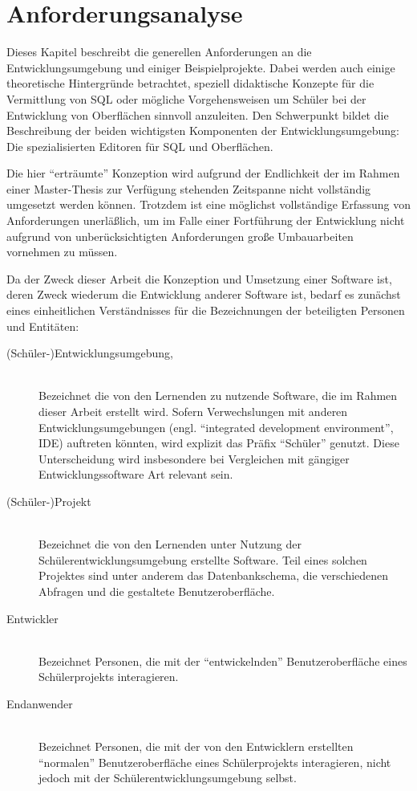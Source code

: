 \section{Anforderungsanalyse}
\label{sec:requirements}

Dieses Kapitel beschreibt die generellen Anforderungen an die Entwicklungsumgebung und einiger Beispielprojekte. Dabei werden auch einige theoretische Hintergründe betrachtet, speziell didaktische Konzepte für die Vermittlung von SQL oder mögliche Vorgehensweisen um Schüler bei der Entwicklung von Oberflächen sinnvoll anzuleiten. Den Schwerpunkt bildet die Beschreibung der beiden wichtigsten Komponenten der Entwicklungsumgebung: Die spezialisierten Editoren für SQL und Oberflächen.

Die hier "`erträumte"' Konzeption wird aufgrund der Endlichkeit der im Rahmen einer Master-Thesis zur Verfügung stehenden Zeitspanne nicht vollständig umgesetzt werden können. Trotzdem ist eine möglichst vollständige Erfassung von Anforderungen unerläßlich, um im Falle einer Fortführung der Entwicklung nicht aufgrund von unberücksichtigten Anforderungen große Umbauarbeiten vornehmen zu müssen.

Da der Zweck dieser Arbeit die Konzeption und Umsetzung einer Software ist, deren Zweck wiederum die Entwicklung anderer Software ist, bedarf es zunächst eines einheitlichen Verständnisses für die Bezeichnungen der beteiligten Personen und Entitäten:

\begin{description}
\item[(Schüler-)Entwicklungsumgebung, \idename] \hfill\\ 
  Bezeichnet die von den Lernenden zu nutzende Software, die im Rahmen dieser Arbeit erstellt wird. Sofern Verwechslungen mit anderen Entwicklungsumgebungen (engl. ``integrated development environment'', IDE) auftreten könnten, wird explizit das Präfix ``Schüler'' genutzt. Diese Unterscheidung wird insbesondere bei Vergleichen mit gängiger Entwicklungssoftware Art relevant sein.
\item[(Schüler-)Projekt] \hfill\\
  Bezeichnet die von den Lernenden unter Nutzung der Schülerentwicklungsumgebung erstellte Software. Teil eines solchen Projektes sind unter anderem das Datenbankschema, die verschiedenen Abfragen und die gestaltete Benutzeroberfläche.
\item[Entwickler] \hfill\\
  Bezeichnet Personen, die mit der ``entwickelnden'' Benutzeroberfläche eines Schülerprojekts interagieren.
\item[Endanwender] \hfill\\
  Bezeichnet Personen, die mit der von den Entwicklern erstellten ``normalen'' Benutzeroberfläche eines Schülerprojekts interagieren, nicht jedoch mit der Schülerentwicklungsumgebung selbst.
\end{description}

